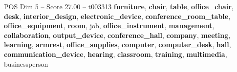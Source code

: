 \begin{textsample}{POS Dim 5 – Score 27.00 – t003313}  \label{ex:f5_pos_027}
\textbf{furniture}, \textbf{chair}, \textbf{table}, \textbf{office\_chair}, \textbf{desk}, \textbf{interior\_design}, \textbf{electronic\_device}, \textbf{conference\_room\_table}, \textbf{office\_equipment}, \textbf{room}, job, \textbf{office\_instrument}, \textbf{management}, \textbf{collaboration}, \textbf{output\_device}, \textbf{conference\_hall}, \textbf{company}, \textbf{meeting}, \textbf{learning}, \textbf{armrest}, \textbf{office\_supplies}, \textbf{computer}, \textbf{computer\_desk}, \textbf{hall}, \textbf{communication\_device}, \textbf{hearing}, \textbf{classroom}, \textbf{training}, \textbf{multimedia}, businessperson

\end{textsample}
